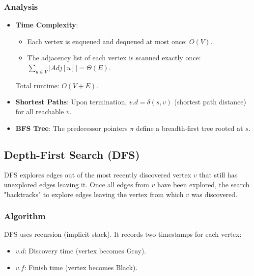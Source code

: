 \documentclass[12pt]{article}
\theoremstyle{blueplain}
\theoremstyle{bluedef}
\theoremstyle{blueremark}
\begin{document}
\subsubsection{Analysis}
\begin{itemize}
    \item \textbf{Time Complexity}:
          \begin{itemize}
              \item Each vertex is enqueued and dequeued at most once: $O(V)$.
              \item The adjacency list of each vertex is scanned exactly once: $\sum_{u \in V} |Adj[u]| = \Theta(E)$.
          \end{itemize}
          Total runtime: $O(V + E)$.
    \item \textbf{Shortest Paths}: Upon termination, $v.d = \delta(s, v)$ (shortest path distance) for all reachable $v$.
    \item \textbf{BFS Tree}: The predecessor pointers $\pi$ define a breadth-first tree rooted at $s$.
\end{itemize}

\subsection{Depth-First Search (DFS)}

DFS explores edges out of the most recently discovered vertex $v$ that still has unexplored edges leaving it. Once all edges from $v$ have been explored, the search "backtracks" to explore edges leaving the vertex from which $v$ was discovered.

\subsubsection{Algorithm}
DFS uses recursion (implicit stack). It records two timestamps for each vertex:
\begin{itemize}
    \item $v.d$: Discovery time (vertex becomes Gray).
    \item $v.f$: Finish time (vertex becomes Black).
\end{itemize}
\end{document}
